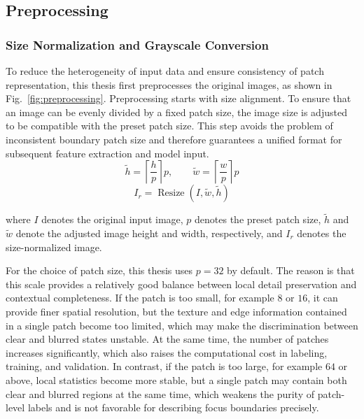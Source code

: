 \subsection{Preprocessing}
\subsubsection{Size Normalization and Grayscale Conversion}
\par To reduce the heterogeneity of input data and ensure consistency of patch
representation, this thesis first preprocesses the original images, as shown in
Fig.~\ref{fig:preprocessing}. Preprocessing starts with size alignment. To
ensure that an image can be evenly divided by a fixed patch size, the image size
is adjusted to be compatible with the preset patch size. This step avoids the
problem of inconsistent boundary patch size and therefore guarantees a unified
format for subsequent feature extraction and model input.
\begin{equation}
    \tilde{h}=\left\lceil \frac{h}{p} \right\rceil p,\qquad
    \tilde{w}=\left\lceil \frac{w}{p} \right\rceil p
    \label{eq:resize-shape}
\end{equation}
\begin{equation}
    I_r=\operatorname{Resize}(I,\tilde{w},\tilde{h})
    \label{eq:resize-op}
\end{equation}
\par where $I$ denotes the original input image, $p$ denotes the preset patch
size, $\tilde{h}$ and $\tilde{w}$ denote the adjusted image height and width,
respectively, and $I_r$ denotes the size-normalized image.

\par For the choice of patch size, this thesis uses $p=32$ by default. The
reason is that this scale provides a relatively good balance between local
detail preservation and contextual completeness. If the patch is too small, for
example $8$ or $16$, it can provide finer spatial resolution, but the texture
and edge information contained in a single patch become too limited, which may
make the discrimination between clear and blurred states unstable. At the same
time, the number of patches increases significantly, which also raises the
computational cost in labeling, training, and validation. In contrast, if the
patch is too large, for example $64$ or above, local statistics become more
stable, but a single patch may contain both clear and blurred regions at the
same time, which weakens the purity of patch-level labels and is not favorable
for describing focus boundaries precisely.


